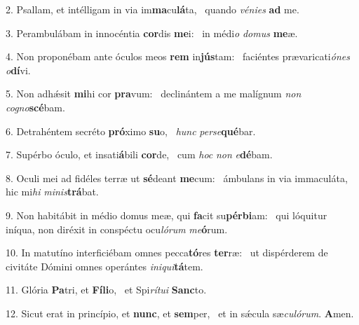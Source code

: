 2. Psallam, et intélligam in via im\textbf{ma}cu\textbf{lá}ta, \ast\  quando \textit{vé}\textit{ni}\textit{es} \textbf{ad} me.\

3. Perambulábam in innocéntia \textbf{cor}dis \textbf{me}i: \ast\  in médi\textit{o} \textit{do}\textit{mus} \textbf{me}æ.\

4. Non proponébam ante óculos meos \textbf{rem} in\textbf{jús}tam: \ast\  faciéntes prævaricati\textit{ó}\textit{nes} \textit{o}\textbf{dí}vi.\

5. Non adhǽsit \textbf{mi}hi cor \textbf{pra}vum: \ast\  declinántem a me malígnum \textit{non} \textit{co}\textit{gno}\textbf{scé}bam.\

6. Detrahéntem secréto \textbf{pró}ximo \textbf{su}o, \ast\  \textit{hunc} \textit{per}\textit{se}\textbf{qué}bar.\

7. Supérbo óculo, et insati\textbf{á}bili \textbf{cor}de, \ast\  cum \textit{hoc} \textit{non} \textit{e}\textbf{dé}bam.\

8. Oculi mei ad fidéles terræ ut \textbf{sé}deant \textbf{me}cum: \ast\  ámbulans in via immaculáta, hic mi\textit{hi} \textit{mi}\textit{nis}\textbf{trá}bat.\

9. Non habitábit in médio domus meæ, qui \textbf{fa}cit su\textbf{pér}\textbf{bi}am: \ast\  qui lóquitur iníqua, non diréxit in conspéctu ocu\textit{ló}\textit{rum} \textit{me}\textbf{ó}rum.\

10. In matutíno interficiébam omnes pecca\textbf{tó}res \textbf{ter}ræ: \ast\  ut dispérderem de civitáte Dómini omnes operántes \textit{in}\textit{i}\textit{qui}\textbf{tá}tem.\

11. Glória \textbf{Pa}tri, et \textbf{Fí}\textbf{li}o, \ast\  et Spi\textit{rí}\textit{tu}\textit{i} \textbf{Sanc}to.\

12. Sicut erat in princípio, et \textbf{nunc}, et \textbf{sem}per, \ast\  et in sǽcula sæ\textit{cu}\textit{ló}\textit{rum}. \textbf{A}men.\


